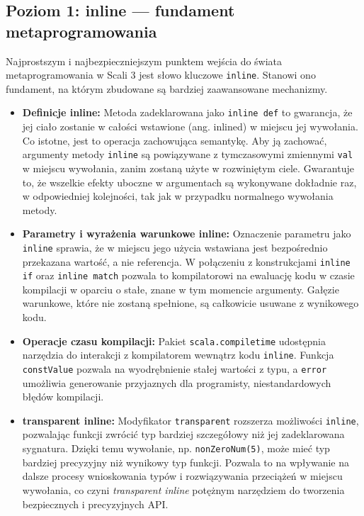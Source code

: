 \subsection{Poziom 1: inline — fundament metaprogramowania}
Najprostszym i najbezpieczniejszym punktem wejścia do świata metaprogramowania w Scali 3 jest słowo kluczowe \verb|inline|.
Stanowi ono fundament, na którym zbudowane są bardziej zaawansowane mechanizmy.
\begin{itemize}
    \item \textbf{Definicje inline:}
    Metoda zadeklarowana jako \verb|inline def| to gwarancja, że jej ciało zostanie w całości wstawione (ang. inlined) w miejscu jej wywołania.
    Co istotne, jest to operacja zachowująca semantykę.
    Aby ją zachować, argumenty metody \verb|inline| są powiązywane z tymczasowymi zmiennymi \verb|val| w miejscu wywołania, zanim zostaną użyte w rozwiniętym ciele.
    Gwarantuje to, że wszelkie efekty uboczne w argumentach są wykonywane dokładnie raz, w odpowiedniej kolejności, tak jak w przypadku normalnego wywołania metody.
    \item \textbf{Parametry i wyrażenia warunkowe inline:}
    Oznaczenie parametru jako \verb|inline| sprawia, że w miejscu jego użycia wstawiana jest bezpośrednio przekazana wartość, a nie referencja.
    W połączeniu z konstrukcjami \verb|inline if| oraz \verb|inline match| pozwala to kompilatorowi na ewaluację kodu w czasie kompilacji w oparciu o stałe, znane w tym momencie argumenty.
    Gałęzie warunkowe, które nie zostaną spełnione, są całkowicie usuwane z wynikowego kodu.
    \item \textbf{Operacje czasu kompilacji:}
    Pakiet \verb|scala.compiletime| udostępnia narzędzia do interakcji z kompilatorem wewnątrz kodu \verb|inline|.
    Funkcja \verb|constValue| pozwala na wyodrębnienie stałej wartości z typu, a \verb|error| umożliwia generowanie przyjaznych dla programisty, niestandardowych błędów kompilacji.
    \item \textbf{transparent inline:}
    Modyfikator \verb|transparent| rozszerza możliwości \verb|inline|, pozwalając funkcji zwrócić typ bardziej szczegółowy niż jej zadeklarowana sygnatura.
    Dzięki temu wywołanie, np. \verb|nonZeroNum(5)|, może mieć typ bardziej precyzyjny niż wynikowy typ funkcji.
    Pozwala to na wpływanie na dalsze procesy wnioskowania typów i rozwiązywania przeciążeń w miejscu wywołania, co czyni \emph{transparent inline} potężnym narzędziem do tworzenia bezpiecznych i precyzyjnych API.
\end{itemize}

